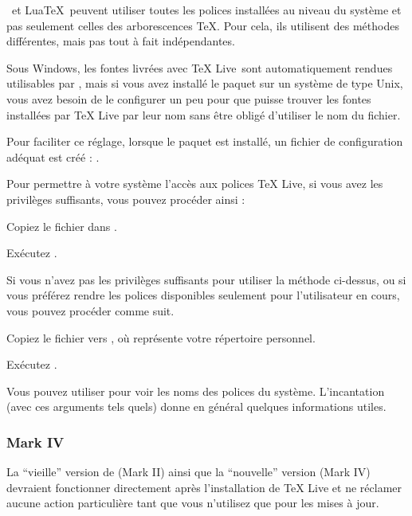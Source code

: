 \documentclass[german, english, french]{article}
\renewcommand{\TL}{\TeX{} Live\xspace}%
\begin{document}
\XeTeX\ et Lua\TeX\ peuvent utiliser toutes les polices installées au niveau du
système et pas seulement celles des arborescences \TeX. Pour cela, ils utilisent
des méthodes différentes, mais pas tout à fait indépendantes.

Sous Windows, les fontes livrées avec \TL\ sont automatiquement rendues
utilisables par \XeTeX, mais si vous avez installé le paquet  sur
un système de type Unix, vous avez besoin de le configurer un peu pour que
\XeTeX{} puisse trouver les fontes installées par \TL{} par leur nom sans être
obligé d'utiliser le nom du fichier.

Pour faciliter ce réglage, lorsque le paquet  est installé, un
fichier de configuration adéquat est créé :
.

Pour permettre à votre système l'accès aux polices \TL, si vous avez les
privilèges suffisants, vous pouvez procéder ainsi :
\begin{enumerate*}
\item Copiez le fichier  dans
  .
\item Exécutez .
\end{enumerate*}

Si vous n'avez pas les privilèges suffisants pour utiliser la méthode ci-dessus,
ou si vous préférez rendre les polices disponibles seulement pour l'utilisateur
en cours, vous pouvez procéder comme suit.
\begin{enumerate*}
\item Copiez le fichier  vers
  , où \filename{~} représente votre répertoire
  personnel.
\item Exécutez .
\end{enumerate*}

Vous pouvez utiliser  pour voir les noms des polices du système.
L'incantation  (avec ces arguments
tels quels) donne en général quelques informations utiles.

\subsubsection{\protect\ConTeXt{} Mark IV}
\label{sec:context-mkiv}

La \enquote{vieille} version de \ConTeXt{} (Mark II) ainsi que la
\enquote{nouvelle} version (Mark IV) devraient fonctionner directement après
l'installation de \TL et ne réclamer aucune action particulière tant que vous
n'utilisez que  pour les mises à jour.
\end{document}

